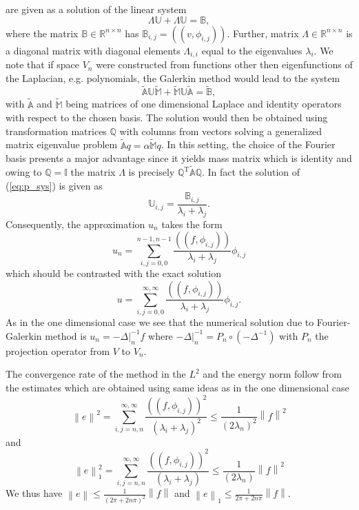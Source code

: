 \documentclass[a4paper,10pt]{article}
\newcommand{\R}{\ensuremath{\mathbb{R}}}
\newcommand{\norm}[1]{\ensuremath{\left\|#1\right\|}}
\newcommand{\Inner}[2]{\ensuremath{\left(\left(#1, #2\right)\right)}}
\begin{document}
  are given as a solution of the linear system
  \begin{equation}
    \label{eq:p_sys}
    \Lambda\mathbb{U} + \Lambda\mathbb{U} = \mathbb{B},
  \end{equation}
  where the matrix $\mathbb{B}\in\R^{n\times n}$ has $\mathbb{B}_{i,
  j}=\Inner{v}{\phi_{i, j}}$. Further, matrix $\Lambda\in\R^{n\times n}$ is
  a diagonal matrix with diagonal elements $\Lambda_{i, i}$ equal to the
  eigenvalues $\lambda_i$. We note that if space $V_n$ were constructed from 
  functions other then eigenfunctions of the Laplacian, e.g. polynomials, the
  Galerkin method would lead to the system
  \[
    \tilde{\mathbb{A}}\mathbb{U}\tilde{\mathbb{M}} +
    \tilde{\mathbb{M}}\mathbb{U}\tilde{\mathbb{A}} =
    \tilde{\mathbb{B}},
  \]
  with $\tilde{\mathbb{A}}$ and $\tilde{\mathbb{M}}$ being matrices of one
  dimensional Laplace and identity operators with respect to the chosen basis.
  The solution would then be obtained using transformation matrices $\mathbb{Q}$
  with columns from vectors solving a generalized matrix eigenvalue problem
  $\tilde{\mathbb{A}}q=\alpha\tilde{\mathbb{M}}q$.
  In this setting, the choice of the Fourier basis presents a major advantage
  since it yields mass matrix which is identity and owing to
  $\mathbb{Q}=\mathbb{I}$ the matrix $\Lambda$ is precisely
  $\mathbb{Q}^{\text{T}}\tilde{\mathbb{A}}\mathbb{Q}$. In fact the solution
  of (\ref{eq:p_sys}) is given as
  \[
    \mathbb{U}_{i, j} = \frac{\mathbb{B}_{i, j}}{\lambda_i + \lambda_j}.
  \]
  Consequently, the approximation $u_n$ takes the form
  \[
    u_n = \sum\limits_{i, j = 0, 0}^{n-1, n-1}\frac{\Inner{f}{\phi_{i, j}}}{\lambda_i + \lambda_j}
    \phi_{i, j}
  \]
  which should be contrasted with the exact solution
  \[
    u = \sum\limits_{i, j = 0, 0}^{\infty, \infty}\frac{\Inner{f}{\phi_{i, j}}}{\lambda_i + \lambda_j}
    \phi_{i, j}.
  \]
  As in the one dimensional case we see that the numerical solution due to
  Fourier-Galerkin method is $u_n = -\Delta|_{n}^{-1}f$ where
  $-\Delta|_{n}^{-1}=P_n \circ \left(-\Delta^{-1}\right)$ with $P_n$ the
  projection operator from $V$ to $V_n$.

  The convergence rate of the method in the $L^2$ and the energy norm follow
  from the estimates which are obtained using same ideas as in the one
  dimensional case
  \[
    \norm{e}^2 = \sum\limits_{i, j = n, n}^{\infty,
    \infty}\frac{\Inner{f}{\phi_{i, j}}^2}{\left(\lambda_i + \lambda_j\right)^2}
      \leq
      \frac{1}{\left(2\lambda_n\right)^2}\norm{f}^2
  \]
  and
\[
    \norm{e}_1^2 = \sum\limits_{i, j = n, n}^{\infty,
    \infty}\frac{\Inner{f}{\phi_{i, j}}^2}{\left(\lambda_i + \lambda_j\right)}
      \leq
      \frac{1}{\left(2\lambda_n\right)}\norm{f}^2
  \]
  We thus have $\norm{e}\leq\frac{1}{\left(2\pi + 2n\pi\right)^2}\norm{f}$ and
  $\norm{e}_1\leq\frac{1}{2\pi + 2n\pi}\norm{f}$.
\end{document}
